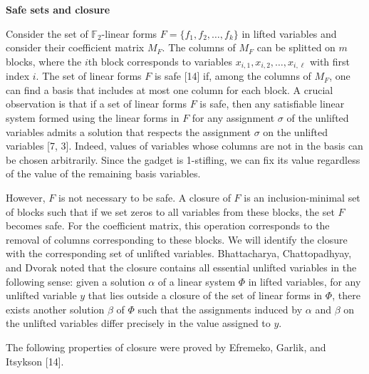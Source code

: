 \documentclass[10pt,a4paper]{article}
\begin{document}
\par\medskip\noindent\textbf{Safe sets and closure}\par


Consider the set of $\mathbb{F}_{2}$-linear forms $F=\{f_{1},f_{2},\dots,f_{k}\}$ in lifted variables and consider their coefficient matrix $M_{F}$. The columns of $M_{F}$ can be splitted on $m$ blocks, where the $i$th block corresponds to variables $x_{i,1},x_{i,2},\dots,x_{i,\ell}$ with first index $i$.
The set of linear forms $F$ is safe [14] if, among the columns of $M_{F}$, one can find a basis that includes at most one column for each block. A crucial observation is that if a set of linear forms $F$ is safe, then any satisfiable linear system formed using the linear forms in $F$ for any assignment $\sigma$ of the unlifted variables admits a solution that respects the assignment $\sigma$ on the unlifted variables [7, 3].
Indeed, values of variables whose columns are not in the basis can be chosen arbitrarily. Since the gadget is 1-stifling, we can fix its value regardless of the value of the remaining basis variables.\par



However, $F$ is not necessary to be safe. A closure of $F$ is an inclusion-minimal set of blocks such that if we set zeros to all variables from these blocks, the set $F$ becomes safe. For the coefficient matrix, this operation corresponds to the removal of columns corresponding to these blocks. We will identify the closure with the corresponding set of unlifted variables. Bhattacharya, Chattopadhyay, and Dvorak
noted that the closure contains all essential unlifted variables in the following sense:
given a solution $\alpha$ of a linear system $\Phi$ in lifted variables, for any unlifted variable $y$ that lies outside a closure of the set of linear forms in $\Phi$, there exists another solution $\beta$ of $\Phi$ such that the assignments induced by $\alpha$ and $\beta$ on the unlifted variables differ precisely in the value assigned to $y$.\par



The following properties of closure were proved by Efremeko, Garlik, and Itsykson [14].\par
\end{document}

